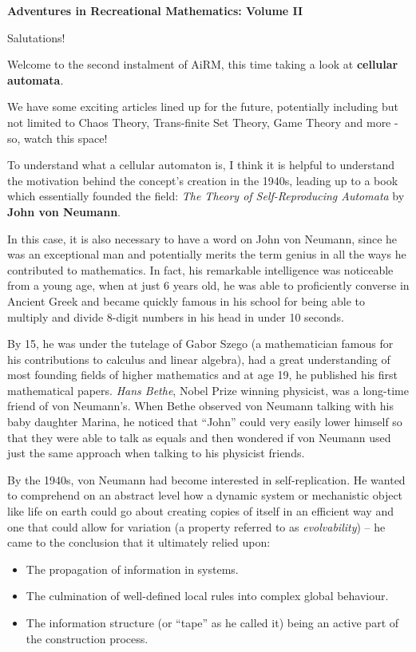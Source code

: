 \textbf{Adventures in Recreational Mathematics: Volume II}

Salutations!

Welcome to the second instalment of AiRM, this time taking a look at
\textbf{cellular automata}.

We have some exciting articles lined up for the future, potentially
including but not limited to Chaos Theory, Trans-finite Set Theory, Game
Theory and more - so, watch this space!

To understand what a cellular automaton is, I think it is helpful to
understand the motivation behind the concept's creation in the 1940s,
leading up to a book which essentially founded the field: \emph{The
Theory of Self-Reproducing Automata} by \textbf{John von Neumann}.

In this case, it is also necessary to have a word on John von Neumann,
since he was an exceptional man and potentially merits the term genius
in all the ways he contributed to mathematics. In fact, his remarkable
intelligence was noticeable from a young age, when at just 6 years old,
he was able to proficiently converse in Ancient Greek and became quickly
famous in his school for being able to multiply and divide 8-digit
numbers in his head in under 10 seconds.

By 15, he was under the tutelage of Gabor Szego (a mathematician famous
for his contributions to calculus and linear algebra), had a great
understanding of most founding fields of higher mathematics and at age
19, he published his first mathematical papers. \emph{Hans Bethe}, Nobel
Prize winning physicist, was a long-time friend of von Neumann's. When
Bethe observed von Neumann talking with his baby daughter Marina, he
noticed that ``John'' could very easily lower himself so that they were
able to talk as equals and then wondered if von Neumann used just the
same approach when talking to his physicist friends.

By the 1940s, von Neumann had become interested in self-replication. He
wanted to comprehend on an abstract level how a dynamic system or
mechanistic object like life on earth could go about creating copies of
itself in an efficient way and one that could allow for variation (a
property referred to as \emph{evolvability}) -- he came to the
conclusion that it ultimately relied upon:

\begin{itemize}
\item
  The propagation of information in systems.
\item
  The culmination of well-defined local rules into complex global
  behaviour.
\item
  The information structure (or ``tape'' as he called it) being an
  active part of the construction process.
\end{itemize}

